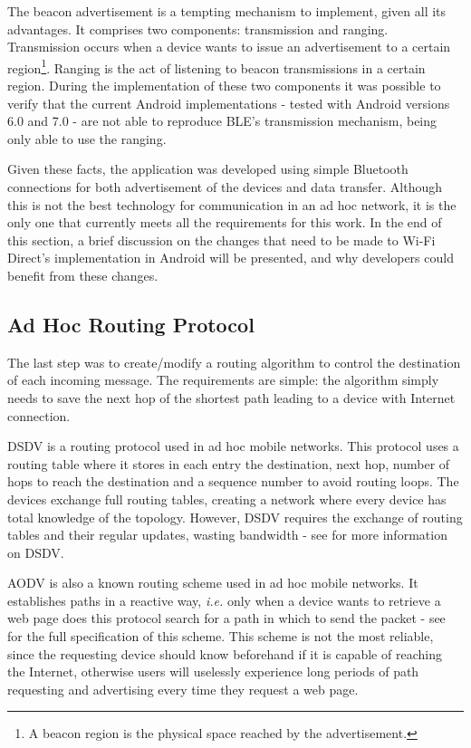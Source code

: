 The beacon advertisement is a tempting mechanism to implement, given all its advantages. It comprises two components: transmission and ranging. Transmission occurs when a device wants to issue an advertisement to a certain region\footnote{A beacon region is the physical space reached by the advertisement.}. Ranging is the act of listening to beacon transmissions in a certain region. During the implementation of these two components it was possible to verify that the current Android implementations - tested with Android versions 6.0 and 7.0 - are not able to reproduce \gls{BLE}'s transmission mechanism, being only able to use the ranging.

Given these facts, the application was developed using simple Bluetooth connections for both advertisement of the devices and data transfer. Although this is not the best technology for communication in an ad hoc network, it is the only one that currently meets all the requirements for this work. In the end of this section, a brief discussion on the changes that need to be made to Wi-Fi Direct's implementation in Android will be presented, and why developers could benefit from these changes.

\subsection{Ad Hoc Routing Protocol}
\label{subsec:routprot}

The last step was to create/modify a routing algorithm to control the destination of each incoming message. The requirements are simple: the algorithm simply needs to save the next hop of the shortest path leading to a device with Internet connection.

\gls{DSDV} is a routing protocol used in ad hoc mobile networks. This protocol uses a routing table where it stores in each entry the destination, next hop, number of hops to reach the destination and a sequence number to avoid routing loops. The devices exchange full routing tables, creating a network where every device has total knowledge of the topology. However, \gls{DSDV} requires the exchange of routing tables and their regular updates, wasting bandwidth - see \cite{dsdv} for more information on \gls{DSDV}.

\gls{AODV} is also a known routing scheme used in ad hoc mobile networks. It establishes paths in a reactive way, \textit{i.e.} only when a device wants to retrieve a web page does this protocol search for a path in which to send the packet - see \cite{aodv} for the full specification of this scheme. This scheme is not the most reliable, since the requesting device should know beforehand if it is capable of reaching the Internet, otherwise users will uselessly experience long periods of path requesting and advertising every time they request a web page.

